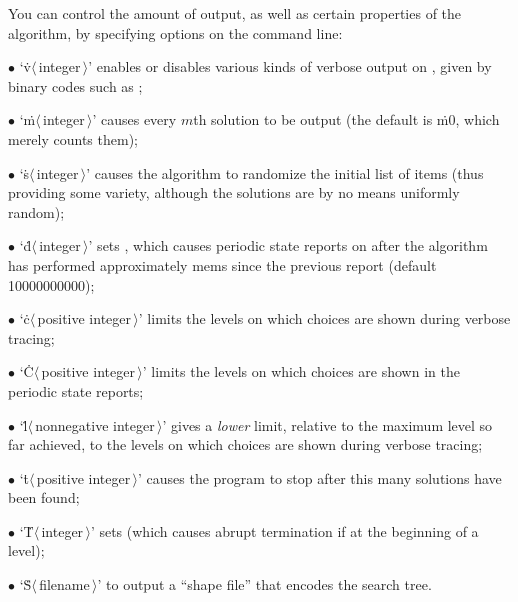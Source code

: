 You can control the amount of output, as well as certain properties
of the algorithm, by specifying options on the command line:
\smallskip\item{$\bullet$}
`\.v$\langle\,$integer$\,\rangle$' enables or disables various kinds of verbose
output on , given by binary codes such as ;
\item{$\bullet$}
`\.m$\langle\,$integer$\,\rangle$' causes every $m$th solution
to be output (the default is \.{m0}, which merely counts them);
\item{$\bullet$}
`\.s$\langle\,$integer$\,\rangle$' causes the algorithm to randomize
the initial list of items (thus providing some variety, although
the solutions are by no means uniformly random);
\item{$\bullet$}
`\.d$\langle\,$integer$\,\rangle$' sets , which causes periodic
state reports on  after the algorithm has performed
approximately
 mems since the previous report (default 10000000000);
\item{$\bullet$}
`\.c$\langle\,$positive integer$\,\rangle$' limits the levels on which
choices are shown during verbose tracing;
\item{$\bullet$}
`\.C$\langle\,$positive integer$\,\rangle$' limits the levels on which
choices are shown in the periodic state reports;
\item{$\bullet$}
`\.l$\langle\,$nonnegative integer$\,\rangle$' gives a {\it lower\/} limit,
relative to the maximum level so far achieved, to the levels on which
choices are shown during verbose tracing;
\item{$\bullet$}
`\.t$\langle\,$positive integer$\,\rangle$' causes the program to
stop after this many solutions have been found;
\item{$\bullet$}
`\.T$\langle\,$integer$\,\rangle$' sets  (which causes abrupt
termination if  at the beginning of a level);
\item{$\bullet$}
`\.S$\langle\,$filename$\,\rangle$' to output a ``shape file'' that encodes
the search tree.

